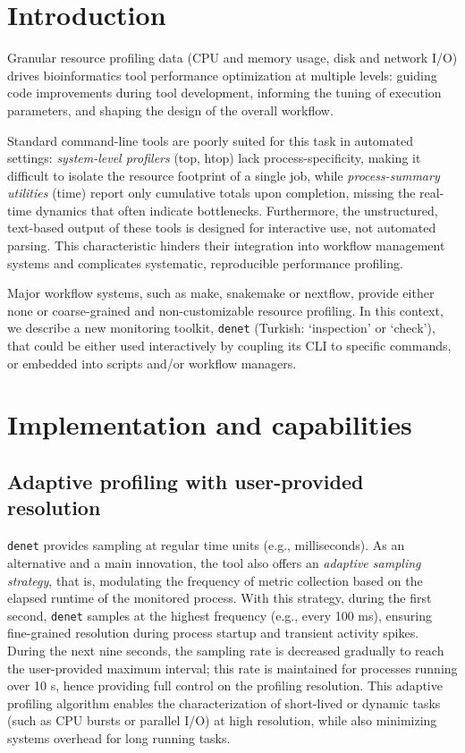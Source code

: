 \documentclass[10pt]{article}
\renewcommand{\label}[1]{\gdef\labelname{##1}}%
\begin{document}
\section*{Introduction}  %
\label{sec:intro}

Granular resource profiling data (CPU and memory usage, disk and network I/O) drives bioinformatics tool performance optimization at multiple levels: guiding code improvements during tool development, informing the tuning of execution parameters, and shaping the design of the overall workflow.

Standard command-line tools are poorly suited for this task in automated settings: \emph{system-level profilers} (top, htop) lack process-specificity, making it difficult to isolate the resource footprint of a single job, while \emph{process-summary utilities} (time) report only cumulative totals upon completion, missing the real-time dynamics that often indicate bottlenecks. Furthermore, the unstructured, text-based output of these tools is designed for interactive use, not automated parsing. This characteristic hinders their integration into workflow management systems and complicates systematic, reproducible performance profiling.

Major workflow systems, such as make, snakemake or nextflow, provide either none or coarse-grained and non-customizable resource profiling. In this context, we describe a new monitoring toolkit, \texttt{denet} (Turkish: `inspection' or `check'), that could be either used interactively by coupling its CLI to specific commands, or embedded into scripts and/or workflow managers.

\section*{Implementation and capabilities}

\subsection*{Adaptive profiling with user-provided resolution}

\texttt{denet} provides sampling at regular time units (e.g., milliseconds). As an alternative and a main innovation, the tool also offers an \emph{adaptive sampling strategy}, that is, modulating the frequency of metric collection based on the elapsed runtime of the monitored process. With this strategy, during the first second, \texttt{denet} samples at the highest frequency (e.g., every 100 ms), ensuring fine-grained resolution during process startup and transient activity spikes. During the next nine seconds, the sampling rate is decreased gradually to reach the user-provided maximum interval; this rate is maintained for processes running over 10 s, hence providing full control on the profiling resolution.
This adaptive profiling algorithm enables the characterization of short-lived or dynamic tasks (such as CPU bursts or parallel I/O) at high resolution, while also minimizing systems overhead for long running tasks.
\end{document}
